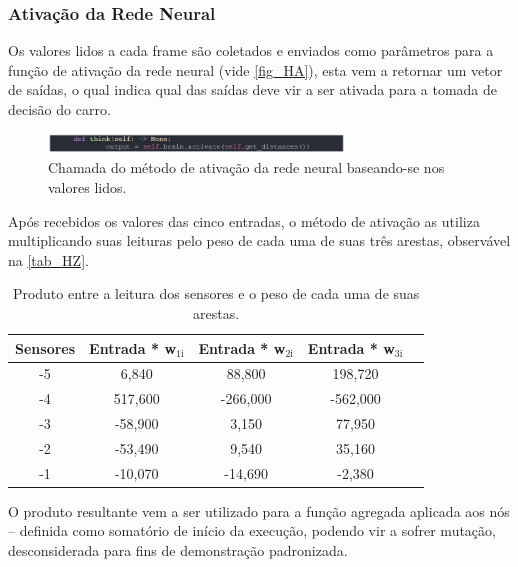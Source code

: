 \subsubsection{Ativação da Rede Neural}
Os valores lidos a cada frame são coletados e enviados como parâmetros para a função de ativação da rede neural (vide \autoref{fig_HA}), esta vem a retornar um vetor de saídas, o qual indica qual das saídas deve vir a ser ativada para a tomada de decisão do carro.

\begin{figure}[htb]
        \centering
        \caption{\label{fig_HA}Chamada do método de ativação da rede neural baseando-se nos valores lidos.}
        \includegraphics[width=0.7\textwidth]{images/HA.png}
\end{figure}

Após recebidos os valores das cinco entradas, o método de ativação as utiliza multiplicando suas leituras pelo peso de cada uma de suas três arestas, observável na \autoref{tab_HZ}.

\begin{table}[htb]
	\centering
    \caption{\label{tab_HZ}Produto entre a leitura dos sensores e o peso de cada uma de suas arestas.}
    \begin{tabular}{ccccc}
        \hline
		\textbf{Sensores} & \textbf{Entrada * w$_{\text{1i}}$} & \textbf{Entrada * w$_{\text{2i}}$} & \textbf{Entrada * w$_{\text{3i}}$} \\ \hline
		-5 & 6,840  & 88,800   & 198,720    \\ \hline
		-4 & 517,600  & -266,000   & -562,000    \\ \hline
		-3 & -58,900  & 3,150   & 77,950   \\ \hline
		-2 & -53,490  & 9,540   & 35,160  \\ \hline
		-1 & -10,070  & -14,690   & -2,380   \\ \hline
    \end{tabular}
    
\end{table}

O produto resultante vem a ser utilizado para a função agregada aplicada aos nós – definida como somatório de início da execução, podendo vir a sofrer mutação, desconsiderada para fins de demonstração padronizada. 

